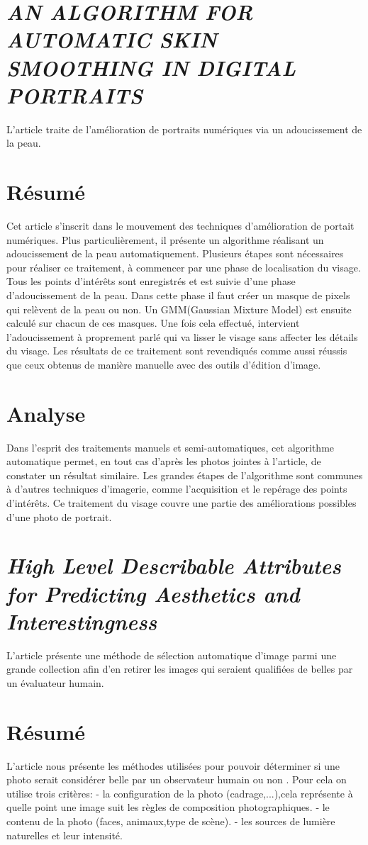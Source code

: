 \documentclass[11pt, french]{report-rd-info}
\begin{document}
\section{\emph{AN ALGORITHM FOR AUTOMATIC SKIN SMOOTHING IN DIGITAL PORTRAITS}}
L'article \cite{Chang} traite de l'amélioration de portraits numériques via un adoucissement de la peau.

\section{Résumé}
Cet article s'inscrit dans le mouvement des techniques d'amélioration de portait numériques.
Plus particulièrement, il présente un algorithme réalisant un adoucissement de la peau automatiquement.
Plusieurs étapes sont nécessaires pour réaliser ce traitement, à commencer par une phase de localisation du visage. 
Tous les points d'intérêts sont enregistrés et est suivie d'une phase d'adoucissement de la peau. 
Dans cette phase il faut créer un masque de pixels qui relèvent de la peau ou non. 
Un GMM(Gaussian Mixture Model) est ensuite calculé sur chacun de ces masques.
Une fois cela effectué, intervient l'adoucissement à proprement parlé qui va lisser le visage sans affecter les détails du visage.
Les résultats de ce traitement sont revendiqués comme aussi réussis que ceux obtenus de manière manuelle avec des outils d'édition d'image.

\section{Analyse}
Dans l'esprit des traitements manuels et semi-automatiques, cet algorithme automatique permet, en tout cas d'après les photos jointes à l'article, de constater un résultat similaire.
Les grandes étapes de l'algorithme sont communes à d'autres techniques d'imagerie, comme l'acquisition et le repérage des points d'intérêts. 
Ce traitement du visage couvre une partie des améliorations possibles d'une photo de portrait.

\section{\emph{High Level Describable Attributes for Predicting Aesthetics and Interestingness}}
L'article \cite{Dhar}  présente une méthode de sélection automatique d'image parmi une grande collection afin d'en retirer les images qui seraient qualifiées de belles par un évaluateur humain.

\section{Résumé}
L'article nous présente les méthodes utilisées pour pouvoir déterminer si une photo serait considérer belle par un observateur humain ou non .
Pour cela on utilise trois critères:
- la configuration de la photo (cadrage,...),cela représente à quelle point une image suit les règles de composition photographiques.
- le contenu de la photo (faces, animaux,type de scène).
- les sources de lumière naturelles et leur intensité.
\end{document}
